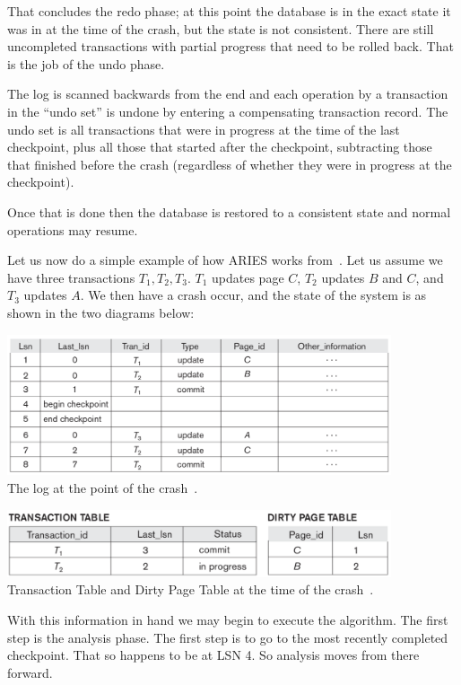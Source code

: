 That concludes the redo phase; at this point the database is in the exact state it was in at the time of the crash, but the state is not consistent. There are still uncompleted transactions with partial progress that need to be rolled back. That is the job of the undo phase.

The log is scanned backwards from the end and each operation by a transaction in the ``undo set'' is undone by entering a compensating transaction record. The undo set is all transactions that were in progress at the time of the last checkpoint, plus all those that started after the checkpoint, subtracting those that finished before the crash (regardless of whether they were in progress at the checkpoint). 

Once that is done then the database is restored to a consistent state and normal operations may resume. 

Let us now do a simple example of how ARIES works from~\cite{fds}. Let us assume we have three transactions $T_{1}, T_{2}, T_{3}$. $T_{1}$ updates page $C$, $T_{2}$ updates $B$ and $C$, and $T_{3}$ updates $A$. We then have a crash occur, and the state of the system is as shown in the two diagrams below:

\begin{center}
\includegraphics[width=0.85\textwidth]{images/aries-1}\\
The log at the point of the crash~\cite{fds}.
\end{center}

\begin{center}
\includegraphics[width=0.85\textwidth]{images/aries-2}\\
Transaction Table and Dirty Page Table at the time of the crash~\cite{fds}.
\end{center}

With this information in hand we may begin to execute the algorithm. The first step is the analysis phase. The first step is to go to the most recently completed checkpoint. That so happens to be at LSN 4. So analysis moves from there forward. 

